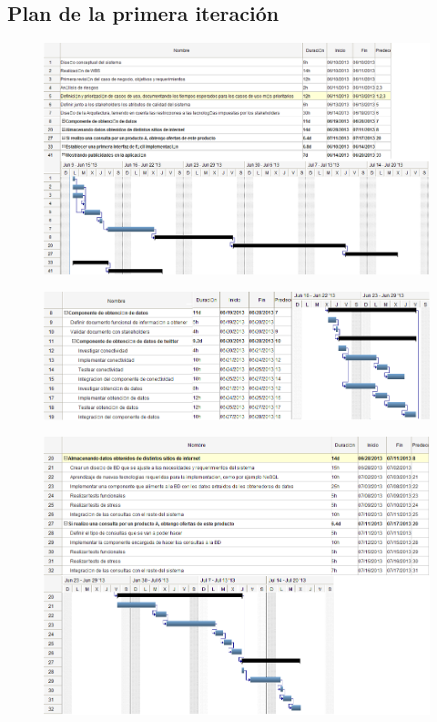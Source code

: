 \begin{landscape}

\subsection{Plan de la primera iteración}

\begin{figure}[H]
\centering
\includegraphics[scale=\escaladefault]{graficos/gantt/gantt.png}
\caption{}
\end{figure}

\begin{figure}[H]
\centering
\includegraphics[scale=\escaladefault]{graficos/gantt/subgantt1.png}
\caption{}
\end{figure}

\begin{figure}[H]
\centering
\includegraphics[scale=\escaladefault]{graficos/gantt/subgantt2.png}
\caption{}
\end{figure}


\end{landscape}

